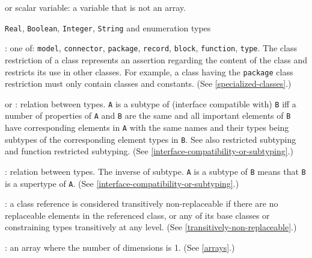  or scalar variable: a variable that is not an array.

 \lstinline!Real!, \lstinline!Boolean!, \lstinline!Integer!, \lstinline!String! and enumeration types

: one of: \lstinline!model!, \lstinline!connector!, \lstinline!package!, \lstinline!record!, \lstinline!block!, \lstinline!function!, \lstinline!type!.  The class restriction of a class represents an assertion regarding the content of the class and restricts its use in other classes.  For example, a class having the \lstinline!package! class restriction must only contain classes and constants.  (See \cref{specialized-classes}.)

 or : relation between types.  \lstinline!A! is a subtype of (interface compatible with) \lstinline!B! iff a number of properties of \lstinline!A! and \lstinline!B! are the same and all important elements of \lstinline!B! have corresponding elements in \lstinline!A! with the same names and their types being subtypes of the corresponding element types in \lstinline!B!. See also restricted subtyping and function restricted subtyping. (See \cref{interface-compatibility-or-subtyping}.)

: relation between types.  The inverse of subtype.  \lstinline!A! is a subtype of \lstinline!B! means that \lstinline!B! is a supertype of \lstinline!A!. (See \cref{interface-compatibility-or-subtyping}.)

: a class reference is considered
transitively non-replaceable if there are no replaceable elements in the
referenced class, or any of its base classes or constraining types
transitively at any level. (See \cref{transitively-non-replaceable}.)

: an array where the number of dimensions is 1. (See
\cref{arrays}.)
